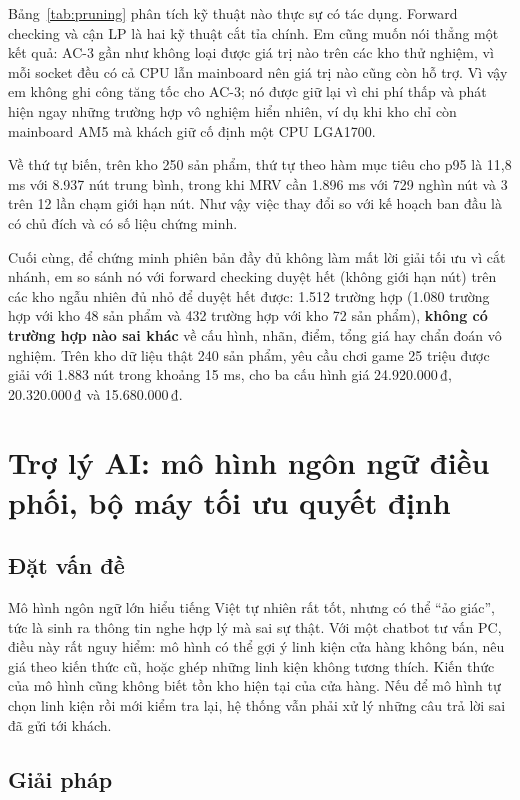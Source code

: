 Bảng~\ref{tab:pruning} phân tích kỹ thuật nào thực sự có tác dụng. Forward checking và cận LP là hai kỹ thuật cắt tỉa chính. Em cũng muốn nói thẳng một kết quả: AC-3 gần như không loại được giá trị nào trên các kho thử nghiệm, vì mỗi socket đều có cả CPU lẫn mainboard nên giá trị nào cũng còn hỗ trợ. Vì vậy em không ghi công tăng tốc cho AC-3; nó được giữ lại vì chi phí thấp và phát hiện ngay những trường hợp vô nghiệm hiển nhiên, ví dụ khi kho chỉ còn mainboard AM5 mà khách giữ cố định một CPU LGA1700.

Về thứ tự biến, trên kho 250 sản phẩm, thứ tự theo hàm mục tiêu cho p95 là 11,8 ms với 8.937 nút trung bình, trong khi MRV cần 1.896 ms với 729 nghìn nút và 3 trên 12 lần chạm giới hạn nút. Như vậy việc thay đổi so với kế hoạch ban đầu là có chủ đích và có số liệu chứng minh.

Cuối cùng, để chứng minh phiên bản đầy đủ không làm mất lời giải tối ưu vì cắt nhánh, em so sánh nó với forward checking duyệt hết (không giới hạn nút) trên các kho ngẫu nhiên đủ nhỏ để duyệt hết được: 1.512 trường hợp (1.080 trường hợp với kho 48 sản phẩm và 432 trường hợp với kho 72 sản phẩm), \textbf{không có trường hợp nào sai khác} về cấu hình, nhãn, điểm, tổng giá hay chẩn đoán vô nghiệm. Trên kho dữ liệu thật 240 sản phẩm, yêu cầu chơi game 25 triệu được giải với 1.883 nút trong khoảng 15 ms, cho ba cấu hình giá 24.920.000\,₫, 20.320.000\,₫ và 15.680.000\,₫.

\section{Trợ lý AI: mô hình ngôn ngữ điều phối, bộ máy tối ưu quyết định}

\subsection{Đặt vấn đề}

Mô hình ngôn ngữ lớn hiểu tiếng Việt tự nhiên rất tốt, nhưng có thể ``ảo giác'', tức là sinh ra thông tin nghe hợp lý mà sai sự thật. Với một chatbot tư vấn PC, điều này rất nguy hiểm: mô hình có thể gợi ý linh kiện cửa hàng không bán, nêu giá theo kiến thức cũ, hoặc ghép những linh kiện không tương thích. Kiến thức của mô hình cũng không biết tồn kho hiện tại của cửa hàng. Nếu để mô hình tự chọn linh kiện rồi mới kiểm tra lại, hệ thống vẫn phải xử lý những câu trả lời sai đã gửi tới khách.

\subsection{Giải pháp}


